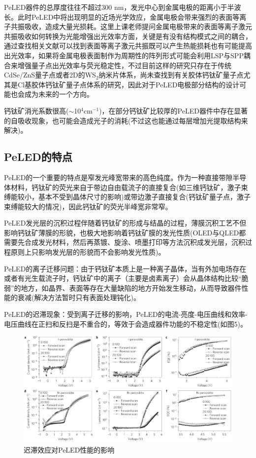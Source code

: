\documentclass{phyasgn}\usepackage{nag}
\begin{document}
\par PeLED器件的总厚度往往不超过300 nm，发光中心到金属电极的距离小于半波长。此时PeLED中将出现明显的近场光学效应，金属电极会带来强烈的表面等离子共振吸收，造成大量光损耗。这里上课老师提问金属电极带来的表面等离子激元共振吸收如何转换为光能增强出光效率方面，关键是有没有结构模式之间的耦合，通过查找相关文献可以找到表面等离子激元共振既可以产生热能损耗也有可能提高出光效率，如果将金属电极表面制作为周期性的阵列形式可能会利用LSP与SPP耦合来增强量子点出光效率与荧光稳定性\cite{rai2021engineering}，不过目前这样的研究只存在于传统CdSe/ZnS量子点或者2D的WS$_2$纳米片体系，尚未查找到有关胶体钙钛矿量子点尤其是Cl基胶体钙钛矿量子点体系的研究，因此对于PeLED电极部分结构的设计可能也会成为未来的一个方向。
\par 钙钛矿消光系数很高($\sim$10$^{4}$cm$^{-1}$)，在部分钙钛矿比较厚的PeLED器件中存在显著的自吸收现象，也可能会造成光子的消耗(不过这也能通过每层增加光提取结构来解决)\cite{cho2020role}。
\subsection{PeLED的特点}
\par PeLED的一个重要的特点是窄发光峰宽带来的高色纯度。作为一种直接带隙半导体材料，钙钛矿的荧光来自于带边自由载流子的直接复合(如三维钙钛矿，激子束缚能较小，基本不受到晶体尺寸的影响)或带边激子直接复合(钙钛矿量子点，激子束缚能较大的情况)，因此钙钛矿的荧光半峰宽非常窄。
\par PeLED发光层的沉积过程伴随着钙钛矿的形成与结晶的过程，薄膜沉积工艺不但影响钙钛矿薄膜的形貌，也极大地影响着钙钛矿膜的发光性质(OLED与QLED都需要先合成发光材料，然后再蒸镀、旋涂、喷墨打印等方法沉积成发光层，沉积过程原则上只影响发光层的形貌而不会影响发光性质)。
\par PeLED的离子迁移问题：由于钙钛矿本质上是一种离子晶体，当有外加电场存在或者有光生载流子时，钙钛矿中的离子（主要是卤素离子）会从晶体结构比较“脆弱”的地方，如晶界、表面等存在大量缺陷的地方开始发生移动，从而导致器件性能的衰减\cite{wang2016stability}(解决方法暂时只有表面处理钝化)。
\par PeLED的迟滞现象：受到离子迁移的影响，PeLED的电流-亮度-电压曲线和效率-电压曲线在正扫和反扫是不重合的，等效于会造成器件功能的不稳定性(如图5)。
	\begin{figure}[H]
		\centering
		\hspace{2em}\includegraphics[width=.9\linewidth]{pic/4.png}
		\caption{迟滞效应对PeLED性能的影响\cite{xiao2017efficient}
		}
	\end{figure}
\end{document}
